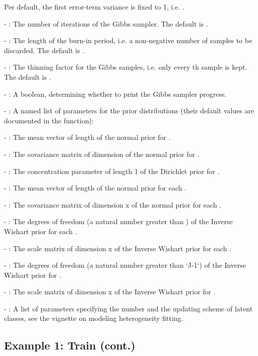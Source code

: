 \documentclass[article]{jss}
\newcommand{\fct}[1]{\code{#1()}}
\begin{document}
  Per default, the first error-term variance is fixed to 1, i.e. .

- : The number of iterations of the Gibbs sampler. The default is .

- : The length of the burn-in period, i.e. a non-negative number of samples to be discarded. The default is .

- : The thinning factor for the Gibbs samples, i.e. only every th sample is kept. The default is .

- : A boolean, determining whether to print the Gibbs sampler progress.

- : A named list of parameters for the prior distributions (their default values are documented in the \fct{check\_prior} function):

  - : The mean vector of length  of the normal prior for .

  - : The covariance matrix of dimension  of the normal prior for .

  - : The concentration parameter of length 1 of the Dirichlet prior for .

  - : The mean vector of length  of the normal prior for each .

  - : The covariance matrix of dimension  x  of the normal prior for each .

  - : The degrees of freedom (a natural number greater than ) of the Inverse Wishart prior for each .

  - : The scale matrix of dimension  x  of the Inverse Wishart prior for each .

  - : The degrees of freedom (a natural number greater than `J-1`) of the Inverse Wishart prior for .

  - : The scale matrix of dimension  x  of the Inverse Wishart prior for .

- : A list of parameters specifying the number and the updating scheme of latent classes, see the vignette on modeling heterogeneity fitting.

\subsection{Example 1: Train (cont.)} \label{subsec:train_cont}
\end{document}
